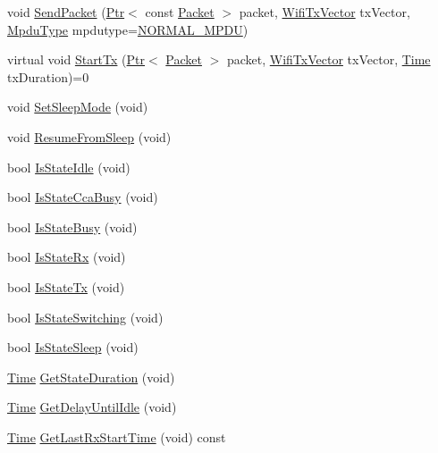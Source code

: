 \begin{DoxyCompactItemize}
\item 
void \hyperlink{classns3_1_1WifiPhy_a4caf22eb334a9caca21ec37d90a74ce2}{Send\+Packet} (\hyperlink{classns3_1_1Ptr}{Ptr}$<$ const \hyperlink{classns3_1_1Packet}{Packet} $>$ packet, \hyperlink{classns3_1_1WifiTxVector}{Wifi\+Tx\+Vector} tx\+Vector, \hyperlink{namespacens3_ae617d41bbd0c07fa58ee2306f687b055}{Mpdu\+Type} mpdutype=\hyperlink{namespacens3_ae617d41bbd0c07fa58ee2306f687b055a1fa7c2077d3b19b000b35004914f50eb}{N\+O\+R\+M\+A\+L\+\_\+\+M\+P\+DU})
\item 
virtual void \hyperlink{classns3_1_1WifiPhy_a01fcffcb00b40a0eef471980d1a5f510}{Start\+Tx} (\hyperlink{classns3_1_1Ptr}{Ptr}$<$ \hyperlink{classns3_1_1Packet}{Packet} $>$ packet, \hyperlink{classns3_1_1WifiTxVector}{Wifi\+Tx\+Vector} tx\+Vector, \hyperlink{classns3_1_1Time}{Time} tx\+Duration)=0
\item 
void \hyperlink{classns3_1_1WifiPhy_a6d10a0cf24eef88269b69eb10d2fc139}{Set\+Sleep\+Mode} (void)
\item 
void \hyperlink{classns3_1_1WifiPhy_a8a5e02de62df1b83db148f8cdf6f834b}{Resume\+From\+Sleep} (void)
\item 
bool \hyperlink{classns3_1_1WifiPhy_ae7f8f4befd54e3a32c382758e9adbe3a}{Is\+State\+Idle} (void)
\item 
bool \hyperlink{classns3_1_1WifiPhy_afe938e16aa449938c9f451bd9ce7dd3f}{Is\+State\+Cca\+Busy} (void)
\item 
bool \hyperlink{classns3_1_1WifiPhy_abbf0d4d2fda49760933d9d369f3ba2bb}{Is\+State\+Busy} (void)
\item 
bool \hyperlink{classns3_1_1WifiPhy_a754ce070e2635c324a0b818b56eb0a4c}{Is\+State\+Rx} (void)
\item 
bool \hyperlink{classns3_1_1WifiPhy_a2bc2591a68dbea15f9ff95fc6722e6c1}{Is\+State\+Tx} (void)
\item 
bool \hyperlink{classns3_1_1WifiPhy_a84d633dc83b1add93b0030f6b57f8a90}{Is\+State\+Switching} (void)
\item 
bool \hyperlink{classns3_1_1WifiPhy_a8bd9da47d76e644f0bb1979eb0ea15fd}{Is\+State\+Sleep} (void)
\item 
\hyperlink{classns3_1_1Time}{Time} \hyperlink{classns3_1_1WifiPhy_a23f85409b2a6d02e9338e91d39bb8572}{Get\+State\+Duration} (void)
\item 
\hyperlink{classns3_1_1Time}{Time} \hyperlink{classns3_1_1WifiPhy_aa02ed143ca902af230b9e177ed0d7603}{Get\+Delay\+Until\+Idle} (void)
\item 
\hyperlink{classns3_1_1Time}{Time} \hyperlink{classns3_1_1WifiPhy_add9d9f1db60400addf4117e645862421}{Get\+Last\+Rx\+Start\+Time} (void) const 

\end{DoxyCompactItemize}
